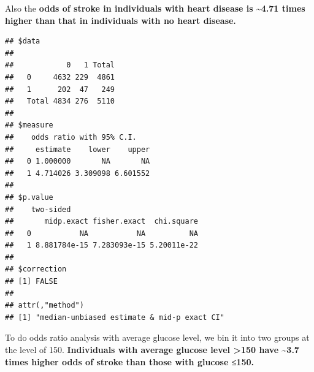 \documentclass[
]{article}
\newenvironment{Shaded}{\begin{snugshade}}{\end{snugshade}}
\newcommand{\AttributeTok}[1]{\textcolor[rgb]{0.13,0.29,0.53}{#1}}
\newcommand{\DecValTok}[1]{\textcolor[rgb]{0.00,0.00,0.81}{#1}}
\newcommand{\FunctionTok}[1]{\textcolor[rgb]{0.13,0.29,0.53}{\textbf{#1}}}
\newcommand{\NormalTok}[1]{#1}
\newcommand{\OtherTok}[1]{\textcolor[rgb]{0.56,0.35,0.01}{#1}}
\newcommand{\SpecialCharTok}[1]{\textcolor[rgb]{0.81,0.36,0.00}{\textbf{#1}}}
\begin{document}
Also the \textbf{odds of stroke in individuals with heart disease is
\textasciitilde4.71 times higher than that in individuals with no heart
disease.}

\begin{Shaded}
\end{Shaded}

\begin{verbatim}
## $data
##        
##            0   1 Total
##   0     4632 229  4861
##   1      202  47   249
##   Total 4834 276  5110
## 
## $measure
##    odds ratio with 95% C.I.
##     estimate    lower    upper
##   0 1.000000       NA       NA
##   1 4.714026 3.309098 6.601552
## 
## $p.value
##    two-sided
##       midp.exact fisher.exact  chi.square
##   0           NA           NA          NA
##   1 8.881784e-15 7.283093e-15 5.20011e-22
## 
## $correction
## [1] FALSE
## 
## attr(,"method")
## [1] "median-unbiased estimate & mid-p exact CI"
\end{verbatim}

To do odds ratio analysis with average glucose level, we bin it into two
groups at the level of 150. \textbf{Individuals with average glucose
level \textgreater150 have \textasciitilde3.7 times higher odds of
stroke than those with glucose ≤150.}

\begin{Shaded}
\end{Shaded}
\end{document}
